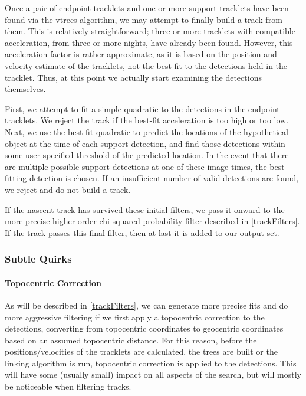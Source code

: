 Once a pair of endpoint tracklets and one or more support tracklets
have been found via the vtrees algorithm, we may attempt to finally
build a track from them.  This is relatively straightforward; three or
more tracklets with compatible acceleration, from three or more
nights, have already been found.  However, this acceleration factor is
rather approximate, as it is based on the position and velocity
estimate of the tracklets, not the best-fit to the detections held in
the tracklet.  Thus, at this point we actually start examining the
detections themselves.

First, we attempt to fit a simple quadratic to the detections in the
endpoint tracklets.  We reject the track if the best-fit acceleration
is too high or too low.  Next, we use the best-fit quadratic to
predict the locations of the hypothetical object at the time of each
support detection, and find those detections within some
user-specified threshold of the predicted location.  In the event that
there are multiple possible support detections at one of these image
times, the best-fitting detection is chosen.  If an insufficient
number of valid detections are found, we reject and do not build a
track.

If the nascent track has survived these initial filters, we pass it
onward to the more precise higher-order chi-squared-probability filter
described in \ref{trackFilters}.  If the track passes this final
filter, then at last it is added to our output set.


\subsubsection{Subtle Quirks}

\paragraph{Topocentric Correction}
As will be described in \ref{trackFilters}, we can generate more
precise fits and do more aggressive filtering if we first apply a
topocentric correction to the detections, converting from topocentric
coordinates to geocentric coordinates based on an assumed topocentric
distance.  For this reason, before the positions/velocities of the
tracklets are calculated, the trees are built or the linking algorithm
is run, topocentric correction is applied to the detections.  This
will have some (usually small) impact on all aspects of the search,
but will mostly be noticeable when filtering tracks.  



